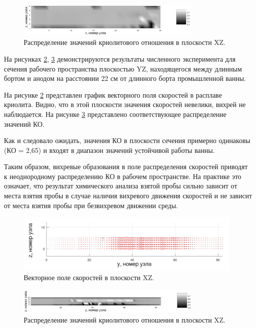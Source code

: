 \documentclass[pdflatex,sn-mathphys-gost]{pmi-jnl}
\begin{document}
\begin{figure}[ht]
    \centering
    \includegraphics[width=90mm]{heatmapxz_art.png}
    \caption{Распределение значений криолитового отношения в плоскости XZ.}
    \label{fig:crxz} 
\end{figure}

На рисунках \ref{fig:veloyz}, \ref{fig:cryz} демонстрируются результаты численного эксперимента для сечения рабочего пространства плоскостью YZ, находящегося между длинным бортом и анодом на расстоянии 22 см от длинного борта промышленной ванны.	

На рисунке \ref{fig:veloyz} представлен график векторного поля скоростей в расплаве криолита. Видно, что в этой плоскости значения скоростей невелики, вихрей не наблюдается. На рисунке \ref{fig:cryz} представлено соответствующее распределение значений КО.

Как и следовало ожидать, значения КО в плоскости сечения примерно одинаковы (КО = 2,65) и входят в диапазон значений устойчивой работы ванны. 

Таким образом, вихревые образования в поле распределения скоростей приводят к неоднородному распределению КО в рабочем пространстве. На практике это означает, что результат химического анализа взятой пробы сильно зависит от места взятия пробы в случае наличия вихревого движения скоростей и не зависит от места взятия пробы при безвихревом движении среды.

\begin{figure}[ht]
    \centering
    \includegraphics[width=110mm]{veloyz_art.png}
    \caption{Векторное поле скоростей в плоскости XZ.}
    \label{fig:veloyz} 
\end{figure}

\begin{figure}[ht]
    \centering
    \includegraphics[width=90mm]{heatmapyz_art.png}
    \caption{Распределение значений криолитового отношения в плоскости XZ.}
    \label{fig:cryz} 
\end{figure}
\end{document}

